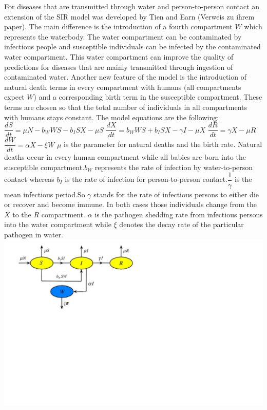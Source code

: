 \documentclass[11pt]{article}
\begin{document}
\linebreak
For diseases that are transmitted through water and person-to-person contact an extension of the SIR model was developed by Tien and Earn (Verweis zu ihrem paper). The main difference is the introduction of a fourth compartment $ W $ which represents the waterbody. The water compartment can be contaminated by infectious people and susceptible individuals can be infected by the contaminated water compartment. This water compartment can improve the quality of predictions for diseases that are mainly transmitted through ingestion of contaminated water.
\linebreak
Another new feature of the model is the introduction of natural death terms in every compartment with humans (all compartments expect $ W $) and a corresponding birth term in the susceptible compartment. These terms are chosen so that the total number of individuals in all compartments with humans stays constant.
The model equations are the following:
\linebreak
$ \dfrac{dS}{dt}=\mu N-b_{W}WS-b_{I}SX-\mu S $
\linebreak
$ \dfrac{dX}{dt}=b_{W}WS+b_{I}SX-\gamma I-\mu X$
\linebreak
$ \dfrac{dR}{dt}=\gamma X-\mu R $
\linebreak
$ \dfrac{dW}{dt}=\alpha X-\xi W $
\linebreak
$ \mu $ is the parameter for natural deaths and the birth rate. Natural deaths occur in every human compartment while all babies are born into the susceptible compartment.$ b_{W} $ represents the rate of infection by water-to-person contact whereas $ b_{I} $ is the rate of infection for person-to-person contact.$ \dfrac{1}{\gamma } $ is the mean infectious period.So $ \gamma $ stands for the rate of infectious persons to either die or recover and become immune. In both cases those individuals change from the $ X $ to the $ R $ compartment. $ \alpha $ is the pathogen shedding rate from infectious persons into the water compartment while $ \xi $ denotes the decay rate of the particular pathogen in water.
\linebreak
\includegraphics[scale=1]{flow diagram SIWR.jpg}
\end{document}
